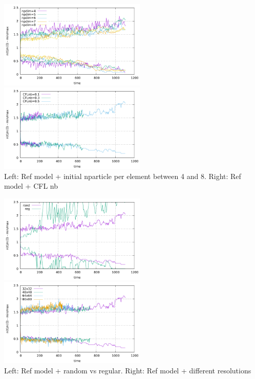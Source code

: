 \begin{center}
\includegraphics[width=7cm]{python_codes/fieldstone_30/results_solcx/markercount_npd}
\includegraphics[width=7cm]{python_codes/fieldstone_30/results_solcx/markercount_cflnb}\\
{\captionfont Left: Ref model + initial nparticle per element between 4 and 8. Right: Ref model + CFL nb}
\end{center}

\begin{center}
\includegraphics[width=7cm]{python_codes/fieldstone_30/results_solcx/markercount_reg}
\includegraphics[width=7cm]{python_codes/fieldstone_30/results_solcx/markercount_res}\\
{\captionfont Left: Ref model + random vs regular. Right: Ref model + different resolutions}
\end{center}

